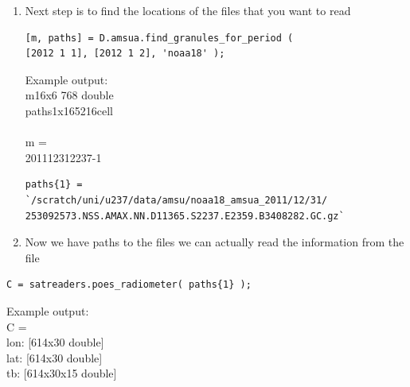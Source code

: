 \documentclass[12pt,a4paper]{article}
\begin{document}
\newpage\begin{enumerate}[resume]
\item Next step is to find the locations of the files that you want to read

\begin{lstlisting}
[m, paths] = D.amsua.find_granules_for_period (
[2012 1 1], [2012 1 2], 'noaa18' );
\end{lstlisting}
Example output:\\
m\hspace{1cm}16x6 \hspace{1cm}768\hspace{0.2cm} double\\          
paths\hspace{0.4cm}1x16\hspace{1cm}5216\hspace{0.2cm}cell\\\\
m = \\
\hspace{0.4cm}2011\hspace{0.6cm}12\hspace{0.6cm}31\hspace{0.6cm}22\hspace{0.6cm}37\hspace{0.6cm}-1
\begin{lstlisting}
paths{1} =
`/scratch/uni/u237/data/amsu/noaa18_amsua_2011/12/31/
253092573.NSS.AMAX.NN.D11365.S2237.E2359.B3408282.GC.gz`
\end{lstlisting}

\item Now we have paths to the files we can actually read the information from the file
\end{enumerate}
\begin{lstlisting}
C = satreaders.poes_radiometer( paths{1} );
\end{lstlisting}
Example output:\\
C = \\
\hspace{0.5cm}lon:\hspace{0.2cm} [614x30 double]\\
\hspace{0.5cm}lat:\hspace{0.25cm} [614x30 double]\\
\hspace{0.5cm}tb:\hspace{0.35cm} [614x30x15 double]\\
\end{document}
